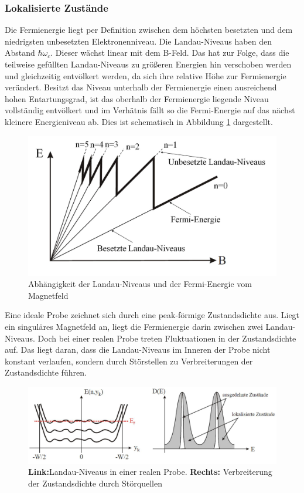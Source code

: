 \subsubsection{Lokalisierte Zustände}
\label{sec:lokalisierte Zust}

Die Fermienergie liegt per Definition zwischen dem höchsten besetzten und dem niedrigsten unbesetzten Elektronenniveau. Die Landau-Niveaus haben den Abstand $\hbar\omega_c$. Dieser wächst linear mit dem B-Feld. Das hat zur Folge, dass die teilweise gefüllten Landau-Niveaus zu größeren Energien hin verschoben werden und gleichzeitig entvölkert werden, da sich ihre relative Höhe zur Fermienergie verändert. Besitzt das Niveau unterhalb der Fermienergie einen ausreichend hohen Entartungsgrad, ist das oberhalb der Fermienergie liegende Niveau vollständig entvölkert und im Verhätnis fällt so die Fermi-Energie auf das nächst kleinere Energieniveau ab. Dies ist schematisch in Abbildung \ref{fig:Lokalisierte_Zust_Anleitungsheft} dargestellt.

\begin{figure}[h]
\centering
\includegraphics[width=0.7\linewidth]{images/Anleitungsheft/Lokalisierte_Zust_Anleitungsheft}
\caption[fig:landau vs fermi]{Abhängigkeit der Landau-Niveaus und der Fermi-Energie vom Magnetfeld}
\label{fig:Lokalisierte_Zust_Anleitungsheft}
\end{figure}

Eine ideale Probe zeichnet sich durch eine peak-förmige Zustandsdichte aus. Liegt ein singuläres Magnetfeld an, liegt die Fermienergie darin zwischen zwei Landau-Niveaus. Doch bei einer realen Probe treten Fluktuationen in der Zustandsdichte auf. Das liegt daran, dass die Landau-Niveaus im Inneren der Probe nicht konstant verlaufen, sondern durch Störstellen zu Verbreiterungen der Zustandsdichte führen.

\begin{figure}[h]
\centering
\includegraphics[width=0.7\linewidth]{images/Anleitungsheft/fermi_landau_Anleitungsheft}
\caption[fermi vs landau fig]{\textbf{Link:}Landau-Niveaus in einer realen Probe. \textbf{Rechts:} Verbreiterung der Zustandsdichte durch Störquellen}
\label{fig:fermi_landau_Anleitungsheft}
\end{figure}

